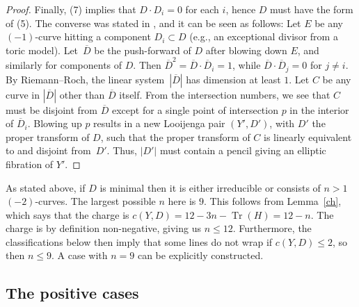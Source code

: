 \documentclass[pdftex]{sigma}
\numberwithin{equation}{section}
\numberwithin{figure}{section}
\numberwithin{table}{section}
\DeclareMathOperator{\Tr}{Tr}
\let\?=\overline
\theoremstyle{definition}
\begin{document}
\begin{proof}
Finally, (7) implies that $D\cdot D_i=0$ for each $i$, hence $D$ must have the form of (5). The converse was stated in \cite[Section~0.5.2, arXiv v1]{GHK1}, and it can be seen as follows: Let $E$ be any $(-1)$-curve hitting a component $D_i\subset D$ (e.g., an exceptional divisor from a toric model). Let~$\?{D}$ be the push-forward of $D$ after blowing down $E$, and similarly for components of $D$. Then $\?{D}^2=\?{D}\cdot \?{D}_i=1$, while $\?{D}\cdot \?{D}_j=0$ for $j\neq i$. By Riemann--Roch, the linear system~$|\?{D}|$ has dimension at least $1$. Let $C$ be any curve in $|\?{D}|$ other than $\?{D}$ itself. From the intersection numbers, we see that $C$ must be disjoint from $\?{D}$ except for a single point of intersection $p$ in the interior of $\?{D}_i$. Blowing up $p$ results in a new Looijenga pair $(Y',D')$, with $D'$ the proper transform of $D$, such that the proper transform of $C$ is linearly equivalent to and disjoint from~$D'$. Thus, $|D'|$ must contain a pencil giving an elliptic fibration of $Y'$.
\end{proof}

As stated above, if $D$ is minimal then it is either irreducible or consists of $n>1$ $(-2)$-curves. The largest possible $n$ here is $9$. This follows from Lemma~\ref{ch}, which says that the charge is $c(Y,D)=12-3n-\Tr(H)=12-n$. The charge is by definition non-negative, giving us $n\leq 12$. Furthermore, the classifications below then imply that some lines do not wrap if $c(Y,D)\leq 2$, so then $n\leq 9$. A case with $n=9$ can be explicitly constructed.

\subsection{The positive cases}\label{PositiveCase}
\end{document}
